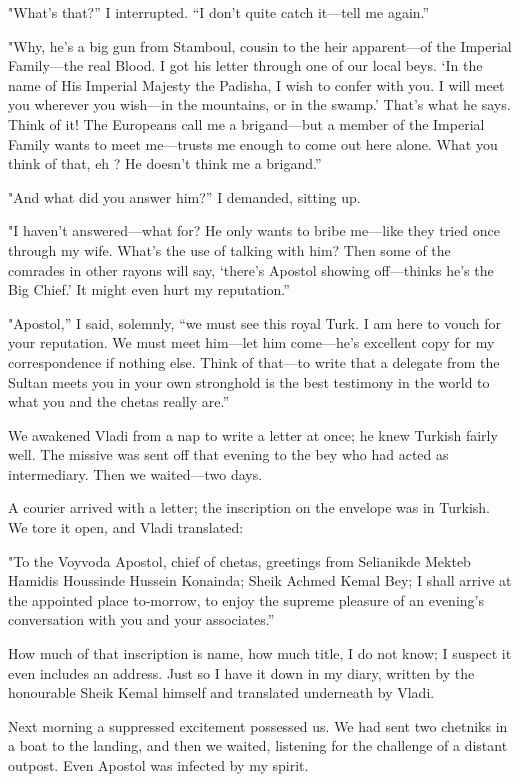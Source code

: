 \documentclass[a5paper,12pt]{book}
\begin{document}
"What’s that?” I interrupted. “I don’t quite catch it—tell me again.” 

"Why, he’s a big gun from Stamboul, cousin to the heir apparent—of the Imperial Family—the real Blood. I got his letter through one of our local beys. ‘In the name of His Imperial Majesty the Padisha, I wish to confer with you. I will meet you wherever you wish—in the mountains, or in the swamp.’ That’s what he says. Think of it! The Europeans call me a brigand—but a member of the Imperial Family wants to meet me—trusts me enough to come out here alone. What you think of that, eh ? He doesn’t think me a brigand.” 

"And what did you answer him?” I demanded, sitting up. 

"I haven’t answered—what for? He only wants to bribe me—like they tried once through my wife. What’s the use of talking with him? Then some of the comrades in other rayons will say, ‘there’s Apostol showing off—thinks he’s the Big Chief.’ It might even hurt my reputation.” 

"Apostol,” I said, solemnly, “we must see this royal Turk. I am here to vouch for your reputation. We must meet him—let him come—he’s excellent copy for my correspondence if nothing else. Think of that—to write that a delegate from the Sultan meets you in your own stronghold is the best testimony in the world to what you and the chetas really are.” 

We awakened Vladi from a nap to write a letter at once; he knew Turkish fairly well. The missive was sent off that evening to the bey who had acted as intermediary. Then we waited—two days. 

A courier arrived with a letter; the inscription on the envelope was in Turkish. We tore it open, and Vladi translated: 

"To the Voyvoda Apostol, chief of chetas, greetings from Selianikde Mekteb Hamidis Houssinde Hussein Konainda; Sheik Achmed Kemal Bey; I shall arrive at the appointed place to-morrow, to enjoy the supreme pleasure of an evening's conversation with you and your associates.” 

How much of that inscription is name, how much title, I do not know; I suspect it even includes an address. Just so I have it down in my diary, written by the honourable Sheik Kemal himself and translated underneath by Vladi. 

Next morning a suppressed excitement possessed us. We had sent two chetniks in a boat to the landing, and then we waited, listening for the challenge of a distant outpost. Even Apostol was infected by my spirit.
\end{document}
